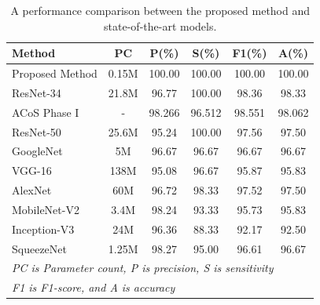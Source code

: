 \begin{table}[htbp]
\caption{ A performance comparison between the proposed method and state-of-the-art models.}
\begin{center}
\begin{tabular}{|l|c|c|c|c|c|}
\hline
\textbf{Method} & \textbf{PC} & \textbf{P(\%)}& \textbf{S(\%)}& \textbf{F1(\%)}& \textbf{A(\%)} \\
\hline
\hline
Proposed Method & 0.15M & 100.00 & 100.00 & 100.00 &100.00\\
\hline
ResNet-34 \cite{nayak2021application} & 21.8M & 96.77& 100.00 & 98.36 &98.33  \\
\hline
ACoS Phase I \cite{chandra2021coronavirus}& - & 98.266 & 96.512 & 98.551 & 98.062 \\
\hline
ResNet-50 \cite{nayak2021application}& 25.6M& 95.24& 100.00& 97.56& 97.50 \\
\hline
GoogleNet \cite{nayak2021application}& 5M &96.67& 96.67& 96.67& 96.67 \\
\hline
VGG-16 \cite{nayak2021application}& 138M& 95.08 & 96.67 & 95.87 &95.83\\
\hline
AlexNet \cite{nayak2021application}& 60M& 96.72 &98.33 & 97.52& 97.50 \\
\hline
MobileNet-V2 \cite{nayak2021application} & 3.4M &98.24& 93.33& 95.73 & 95.83 \\
\hline
Inception-V3 \cite{nayak2021application}& 24M &96.36& 88.33 & 92.17& 92.50\\
\hline
SqueezeNet \cite{nayak2021application}& 1.25M &98.27 &95.00& 96.61& 96.67 \\
\hline
\multicolumn{6}{l}{\textit{ PC is Parameter count, P is precision, S is sensitivity }}\\
\multicolumn{6}{l}{\textit{  F1 is F1-score, and A is accuracy }}\\
\hline
\end{tabular}
\label{modelperf}
\end{center}
\end{table}


